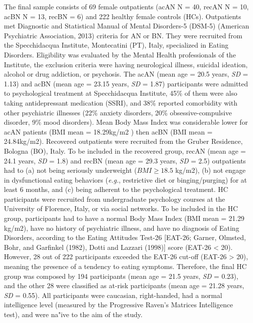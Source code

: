 \documentclass[
  man,floatsintext]{apa6}
\begin{document}
The final sample consists of 69 female outpatients (acAN N = 40, recAN N = 10, acBN N = 13, recBN = 6) and 222 healthy female controls (HCs). Outpatients met Diagnostic and Statistical Manual of Mental Disorders-5 (DSM-5) (American Psychiatric Association, 2013) criteria for AN or BN. They were recruited from the Specchidacqua Institute, Montecatini (PT), Italy, specialized in Eating Disorders. Eligibility was evaluated by the Mental Health professionals of the Institute, the exclusion criteria were having neurological illness, suicidal ideation, alcohol or drug addiction, or psychosis. The acAN (mean age = 20.5 years, \emph{SD} = 1.13) and acBN (mean age = 23.15 years, \emph{SD} = 1.87) participants were admitted to psychological treatment at Specchidacqua Institute, 45\% of them were also taking antidepressant medication (SSRI), and 38\% reported comorbidity with other psychiatric illnesses (22\% anxiety disorders, 20\% obsessive-compulsive disorder, 9\% mood disorders). Mean Body Mass Index was considerable lower for acAN patients (BMI mean = 18.29kg/m2 ) then acBN (BMI mean = 24.84kg/m2). Recovered outpatients were recruited from the Gruber Residence, Bologna (BO), Italy. To be included in the recovered group, recAN (mean age = 24.1 years, \emph{SD} = 1.8) and recBN (mean age = 29.3 years, \emph{SD} = 2.5) outpatients had to (a) not being seriously underweight (\(BMI \ge 18.5\) kg/m2), (b) not engage in dysfunctional eating behaviors (\emph{e.g.}, restrictive diet or binging/purging) for at least 6 months, and (c) being adherent to the psychological treatment. HC participants were recruited from undergraduate psychology courses at the University of Florence, Italy, or via social networks. To be included in the HC group, participants had to have a normal Body Mass Index (BMI mean = 21.29 kg/m2), have no history of psychiatric illness, and have no diagnosis of Eating Disorders, according to the Eating Attitudes Test-26 {[}EAT-26; Garner, Olmsted, Bohr, and Garfinkel (1982), Dotti and Lazzari (1998){]} score (EAT-26 \textless{} 20). However, 28 out of 222 participants exceeded the EAT-26 cut-off (EAT-26 \textgreater{} 20), meaning the presence of a tendency to eating symptoms. Therefore, the final HC group was composed by 194 participants (mean age = 21.5 years, \emph{SD} = 0.23), and the other 28 were classified as at-risk participants (mean age = 21.28 years, \emph{SD} = 0.55).
All participants were caucasian, right-handed, had a normal intelligence level (measured by the Progressive Raven's Matrices Intelligence test), and were na"ive to the aim of the study.
\end{document}
